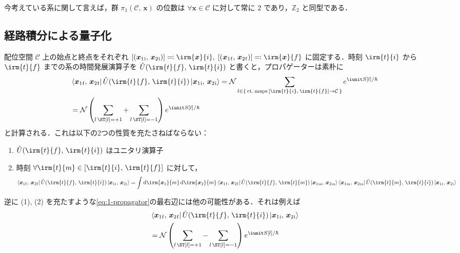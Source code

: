 \documentclass[TQFT_main]{subfiles}
\begin{document}
今考えている系に関して言えば，群 $\pi_1(\mathcal{C},\, \bm{x})$ の位数は $\forall \bm{x} \in \mathcal{C}$ に対して常に $2$ であり，$\mathbb{Z}_2$ と同型である．

\subsection{経路積分による量子化}

配位空間 $\mathcal{C}$ 上の始点と終点をそれぞれ $[(\bm{x}_1{}_{\mathrm{i}},\, \bm{x}_2{}_{\mathrm{i}})] \eqqcolon \irm{\bm{x}}{i},\; [(\bm{x}_1{}_{\mathrm{f}},\, \bm{x}_2{}_{\mathrm{f}})] \eqqcolon \irm{\bm{x}}{f}$ に固定する．時刻 $\irm{t}{i}$ から $\irm{t}{f}$ までの系の時間発展演算子を $\hat{U}(\irm{t}{f},\,\irm{t}{i})$ と書くと，プロパゲーターは素朴に
\begin{align}
    \label{eq:1-propagator}
    &\bra{\bm{x}_1{}_{\mathrm{f}},\, \bm{x}_2{}_{\mathrm{f}}} \hat{U}(\irm{t}{f},\, \irm{t}{i}) \ket{\bm{x}_1{}_{\mathrm{i}},\, \bm{x}_2{}_{\mathrm{i}}} = \mathcal{N} \sum_{l \in \{\, \mathrm{ct.\,maps}\, [\irm{t}{i},\, \irm{t}{f}] \to \mathcal{C}\, \}} e^{\iunit S[l]/\hbar} \\
    &= \mathcal{N} \left( \sum_{l\, \ST [l] = +1} + \sum_{l\, \ST [l] = -1} \right) e^{\iunit S[l]/\hbar} \label{eq:1-propagator-b}
\end{align}
と計算される．これは以下の2つの性質を充たさねばならない：
\begin{enumerate}
    \item $\hat{U}(\irm{t}{f},\, \irm{t}{i})$ はユニタリ演算子
    \item 時刻 $\forall \irm{t}{m} \in [\irm{t}{i},\, \irm{t}{f}]$ に対して，
    \begin{align}
        \label{eq:1-composition}
        \bra{\bm{x}_1{}_{\mathrm{f}},\, \bm{x}_2{}_{\mathrm{f}}} \hat{U}(\irm{t}{f},\, \irm{t}{i}) \ket{\bm{x}_1{}_{\mathrm{i}},\, \bm{x}_2{}_{\mathrm{i}}} = \int \dd{\irm{\bm{x}_1}{m}}\dd{\irm{\bm{x}_2}{m}} \bra{\bm{x}_1{}_{\mathrm{f}},\, \bm{x}_2{}_{\mathrm{f}}} \hat{U}(\irm{t}{f},\, \irm{t}{m}) \ket{\bm{x}_1{}_{\mathrm{m}},\, \bm{x}_2{}_{\mathrm{m}}} \bra{\bm{x}_1{}_{\mathrm{m}},\, \bm{x}_2{}_{\mathrm{m}}} \hat{U}(\irm{t}{m},\, \irm{t}{i}) \ket{\bm{x}_1{}_{\mathrm{i}},\, \bm{x}_2{}_{\mathrm{i}}}
    \end{align}
\end{enumerate}
逆に (1), (2) を充たすような\eqref{eq:1-propagator}の最右辺には他の可能性がある．それは例えば
\begin{align}
    &\bra{\bm{x}_1{}_{\mathrm{f}},\, \bm{x}_2{}_{\mathrm{f}}} \hat{U}(\irm{t}{f},\, \irm{t}{i}) \ket{\bm{x}_1{}_{\mathrm{i}},\, \bm{x}_2{}_{\mathrm{i}}}\\
    &= \mathcal{N} \left( \sum_{l\, \ST [l] = +1} - \sum_{l\, \ST [l] = -1} \right) e^{\iunit S[l]/\hbar} \label{eq:1-propagator-f}
\end{align}
\end{document}
